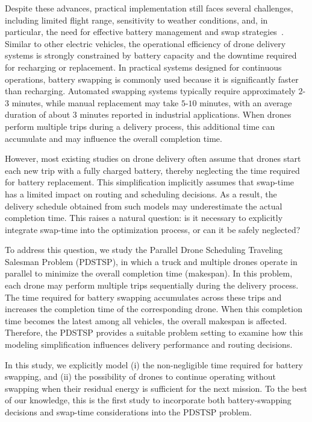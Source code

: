 \documentclass[3p, authoryear, 11pt]{elsarticle}
\begin{document}
Despite these advances, practical implementation still faces several challenges, including limited flight range, sensitivity to weather conditions, and, in particular, the need for effective battery management and swap strategies~\cite{liu_integrating_2025,vilkki_automatic_2024}. Similar to other electric vehicles, the operational efficiency of drone delivery systems is strongly constrained by battery capacity and the downtime required for recharging or replacement. 
In practical systems designed for continuous operations, battery swapping is commonly used because it is significantly faster than recharging. 
Automated swapping systems typically require approximately $2$-$3$ minutes, while manual replacement may take $5$-$10$ minutes, with an average duration of about $3$ minutes reported in industrial applications. 
When drones perform multiple trips during a delivery process, this additional time can accumulate and may influence the overall completion time.

However, most existing studies on drone delivery often assume that drones start each new trip with a fully charged battery, thereby neglecting the time required for battery replacement. This simplification implicitly assumes that swap-time has a limited impact on routing and scheduling decisions. As a result, the delivery schedule obtained from such models may underestimate the actual completion time. This raises a natural question: is it necessary to explicitly integrate swap-time into the optimization process, or can it be safely neglected?

To address this question, we study the Parallel Drone Scheduling Traveling Salesman Problem (PDSTSP), in which a truck and multiple drones operate in parallel to minimize the overall completion time (makespan). In this problem, each drone may perform multiple trips sequentially during the delivery process. The time required for battery swapping accumulates across these trips and increases the completion time of the corresponding drone. When this completion time becomes the latest among all vehicles, the overall makespan is affected. Therefore, the PDSTSP provides a suitable problem setting to examine how this modeling simplification influences delivery performance and routing decisions.

In this study, we explicitly model (i) the non-negligible time required for battery swapping, and (ii) the possibility of drones to continue operating without swapping when their residual energy is sufficient for the next mission.
To the best of our knowledge, this is the first study to incorporate both battery-swapping decisions and swap-time considerations into the PDSTSP problem.
\end{document}
